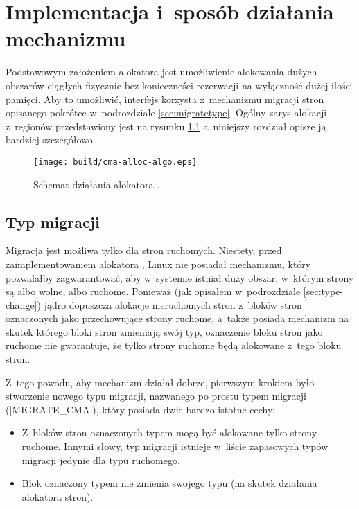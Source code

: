 \chapter{Implementacja i~sposób działania mechanizmu }\label{sec:implementation}

Podstawowym założeniem alokatora  jest umożliwienie alokowania
dużych obszarów ciągłych fizycznie bez konieczneści rezerwacji na
wyłączność dużej ilości pamięci.  Aby to umożliwić, interfejs 
korzysta z~mechanizmu migracji stron opisanego pokrótce w~podrozdziale
\ref{sec:migratetype}.  Ogólny zarys alokacji z~regionów 
przedstawiony jest na rysunku \ref{fig:cma-alloc-algo} a~niniejszy
rozdział opisze ją bardziej szczegółowo.

\begin{figure}[tbp]
  \texttt{[image: build/cma-alloc-algo.eps]}
  \caption{Schemat działania alokatora .}
  \label{fig:cma-alloc-algo}
\end{figure}

\section{Typ migracji }\label{sec:migrate-cma}

Migracja jest możliwa tylko dla stron ruchomych.  Niestety, przed
zaimplementowaniem alokatora , Linux nie posiadał mechanizmu,
który pozwalałby zagwarantować, aby w~systemie istniał duży obszar,
w~którym strony są albo wolne, albo ruchome.  Ponieważ (jak opisałem
w~podrozdziale \ref{sec:type-change}) jądro dopuszcza alokacje
nieruchomych stron z~bloków stron oznaczonych jako przechowujące
strony ruchome, a~także posiada mechanizm na skutek którego bloki
stron zmieniają swój typ, oznaczenie bloku stron jako ruchome nie
gwarantuje, że tylko strony ruchome będą alokowane z~tego bloku stron.

Z~tego powodu, aby mechanizm  działał dobrze, pierwszym
krokiem było stworzenie nowego typu migracji, nazwanego po prostu
typem migracji  (\code|MIGRATE_CMA|), który posiada dwie
bardzo istotne cechy:

\begin{itemize}
\item Z~bloków stron oznaczonych typem  mogą być alokowane tylko
  strony ruchome.  Innymi słowy, typ migracji  istnieje w~liście
  zapasowych typów migracji jedynie dla typu ruchomego.
\item Blok oznaczony typem  nie zmienia swojego typu (na skutek
  działania alokatora stron).
\end{itemize}

